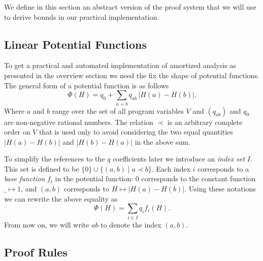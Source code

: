 \documentclass[nocopyrightspace,preprint]{sigplanconf}
\begin{document}
We define in this section an abstract version of the proof system that
we will use to derive bounds in our practical implementation.

\subsection{Linear Potential Functions}

To get a practical and automated implementation of amortized analysis
as presented in the overview section we need the fix the shape of
potential functions.  The general form of a potential function is as follows
$$
\Phi(H) = q_0 + \sum_{a \prec b} q_{ab}\,|H(a) - H(b)|.
$$
Where $a$ and $b$ range over the set of all program variables $V$ and
$(q_{ab})$ and $q_0$ are non-negative rational numbers.  The relation
$\prec$ is an arbitrary complete order on $V$ that is used only to
avoid considering the two equal quantities $|H(a) - H(b)|$ and
$|H(b) - H(a)|$ in the above sum.

To simplify the references to the $q$ coefficients later we introduce
an \emph{index set} $I$.  This set is defined to be $\{0\} \cup
\{(a, b) \mid a \prec b\}$.  Each index $i$ corresponds to a \emph{base
function} $f_i$ in the potential function: $0$ corresponds to the constant
function $\_ \mapsto 1$, and $(a,b)$ corresponds to $H \mapsto
|H(a) - H(b)|$.  Using these notations we can rewrite the above
equality as
$$
\Phi(H) = \sum_{i \in I} q_i f_i(H).
$$
From now on, we will write $ab$ to denote the index $(a,b)$.

\subsection{Proof Rules}
\end{document}
